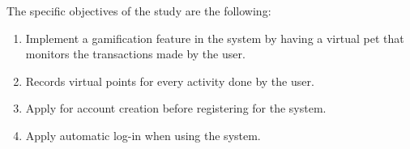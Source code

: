 %
%
The specific objectives of the study are the following:

\begin{comment}
How to formulate your research objectives:
1. Identify what research steps do you need to perform to achieve your general objective.
2. Identify the questions that must be answered for you to achieve your general objective.
    Thereafter, convert these questions into action statements

Example #1:

Research Question:
  What are the general features of a web-based learning environment?

Specific Objective:
   To review existing web-based learning environment that teaches language learning for children


Example #2:

Research Question:
   How will you represent commonsense knowledge for use by computer systems?

Specific Objective:
   To identify knowledge representation approaches used by existing story generation systems

Example #3:
Research Question:
   What types of storytelling knowledge are needed to generate stories?

Specific Objective:
    To identify the different types of storytelling knowledge used in generating stories

Example #4:
Research Question:
    What machine learning approaches will you utilize?

Specific Objective:
    To determine existing machine learning algorithms [that can be used in training the computer system to detect cyberbullying cases] 

Example #5: Research Question:
    How will your research output be evaluated?

Specific Objective:
    To define evaluation metrics for validating the accuracy of the translation

\end{comment}

%
%

\begin{enumerate}
   \item Implement a gamification feature in the system by having a virtual pet that monitors the transactions made by the user.
   \item Records virtual points for every activity done by the user.
   \item Apply for account creation before registering for the system.
   \item Apply automatic log-in when using the system.
\end{enumerate}


